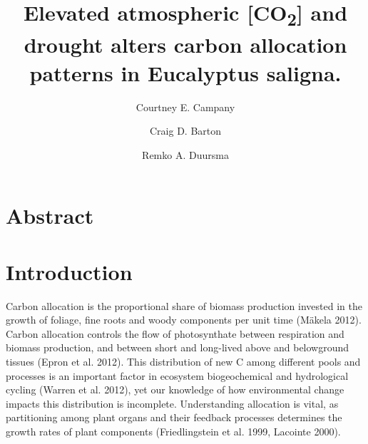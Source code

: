 \documentclass[a4paper]{article}
\begin{document}


\linenumbers

\title{Elevated atmospheric [CO\textsubscript{2}] and drought alters carbon allocation patterns in Eucalyptus saligna.}

\author[1,2]{Courtney E. Campany}
\author[1]{Craig D. Barton}
\author[1]{Remko A. Duursma}


\renewcommand\Authands{ and }
\maketitle




\section*{Abstract}

\section*{Introduction}

Carbon allocation is the proportional share of biomass production invested in the growth of foliage, fine roots and woody components per unit time (Mäkela 2012). Carbon allocation controls the flow of photosynthate between respiration and biomass production, and between short and long-lived above and belowground tissues (Epron et al. 2012). This distribution of new C among different pools and processes is an important factor in ecosystem biogeochemical and hydrological cycling (Warren et al. 2012), yet our knowledge of how environmental change impacts this distribution is incomplete. Understanding allocation is vital, as partitioning among plant organs and their feedback processes determines the growth rates of plant components (Friedlingstein et al. 1999, Lacointe 2000). 
\end{document}
